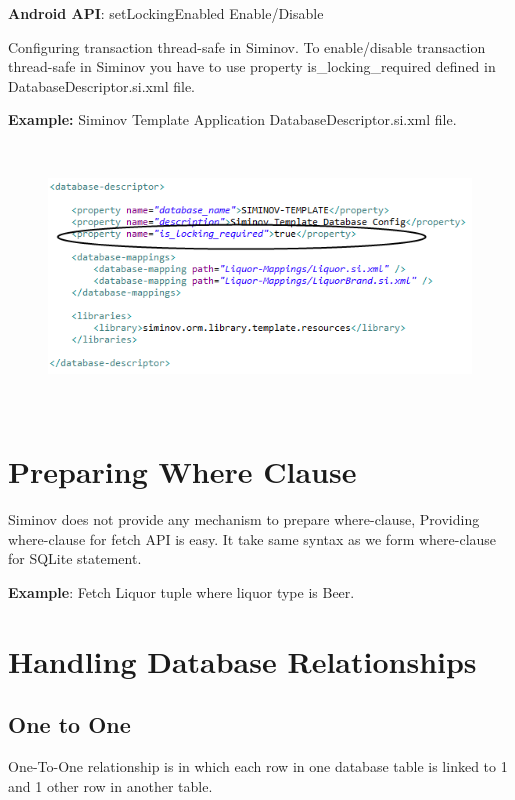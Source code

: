 	\par
	\textbf{Android API}: setLockingEnabled Enable/Disable
		

Configuring transaction thread-safe in Siminov. To enable/disable transaction thread-safe in Siminov you have to use property is\_locking\_required defined in DatabaseDescriptor.si.xml file.

		\par
		\textbf{Example:} Siminov Template Application DatabaseDescriptor.si.xml file.
		\begin{figure}[htbp]
			\centering
				\includegraphics[height=7cm]{Resources/siminov_template_application_is_locking_enable_example.png}
		\end{figure}


\section{Preparing Where Clause}
Siminov does not provide any mechanism to prepare where-clause, Providing where-clause for fetch API is easy. It take same syntax as we form where-clause for SQLite statement.

\textbf{Example}: Fetch Liquor tuple where liquor type is Beer.
	
	


\section{Handling Database Relationships}

	\subsection{One to One}
	One-To-One relationship is in which each row in one database table is linked to 1 and 1 other row in another table.

